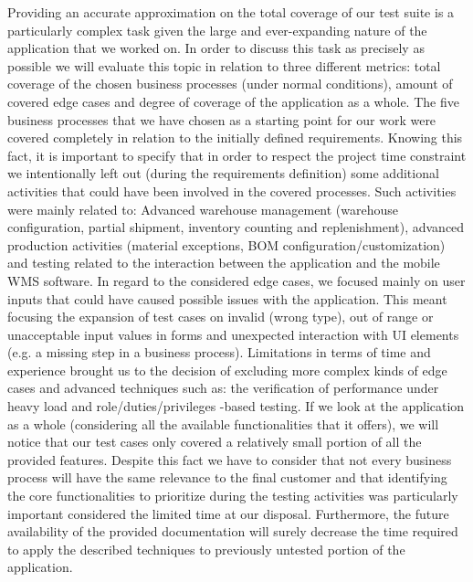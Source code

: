 Providing an accurate approximation on the total coverage of our test suite is a particularly complex task given the large and ever-expanding nature of the application that we worked on. In order to discuss this task as precisely as possible we will evaluate this topic in relation to three different metrics: total coverage of the chosen business processes (under normal conditions), amount of covered edge cases and degree of coverage of the application as a whole. 
The five business processes that we have chosen as a starting point for our work were covered completely in relation to the initially defined requirements. Knowing this fact, it is important to specify that in order to respect the project time constraint we intentionally left out (during the requirements definition) some additional activities that could have been involved in the covered processes. Such activities were mainly related to: Advanced warehouse management (warehouse configuration, partial shipment, inventory counting and replenishment), advanced production activities (material exceptions, BOM configuration/customization) and testing related to the interaction between the application and the mobile WMS software. 
In regard to the considered edge cases, we focused mainly on user inputs that could have caused possible issues with the application. This meant focusing the expansion of test cases on invalid (wrong type), out of range or unacceptable input values in forms and unexpected interaction with UI elements (e.g. a missing step in a business process). Limitations in terms of time and experience brought us to the decision of excluding more complex kinds of edge cases and advanced techniques such as: the verification of performance under heavy load and role/duties/privileges -based testing.
If we look at the application as a whole (considering all the available functionalities that it offers), we will notice that our test cases only covered a relatively small portion of all the provided features. Despite this fact we have to consider that not every business process will have the same relevance to the final customer and that identifying the core functionalities to prioritize during the testing activities was particularly important considered the limited time at our disposal. Furthermore, the future availability of the provided documentation will surely decrease the time required to apply the described techniques to previously untested portion of the application.

